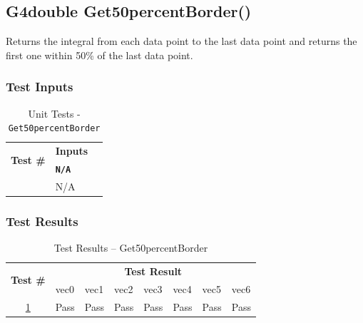 \documentclass[12pt]{article}
\newcounter{TestCounter}
\begin{document}
\subsection{G4double Get50percentBorder()}%
	
	 Returns the integral from each data point to the last data point and returns the first one within 
50\% of the last data point.
	
	\subsubsection{Test Inputs}
		\begin{table}[H]
		\centering
		\caption{Unit Tests - \texttt{Get50percentBorder}}\label{Get50percentBorder_unit}
		\begin{tabular}{lll}
		\toprule
		\multirow{2}{*}{\bf Test \#}  & \multicolumn{1}{c}{\bf Inputs}\\
		& \bf \texttt{N/A}\\\midrule
		{TestCounter}\arabic{TestCounter}\label{Get50percentBorder_0} & N/A \\
		\bottomrule
		\end{tabular}
		\end{table}
	
	\subsubsection{Test Results}
		\begin{table}[H]
		\centering
		\caption{Test Results -- Get50percentBorder}\label{Get50percentBorder_acc}
		\begin{tabular}{clllllll}
		\toprule
		\multirow{2}{*}{\bf Test \#} & \multicolumn{7}{c}{\bf Test Result}\\
		& vec0 & vec1 & vec2 & vec3 & vec4 & vec5 & vec6\\\midrule
		\ref{Get50percentBorder_0} & Pass & Pass & Pass & Pass & Pass & Pass & Pass\\
		\bottomrule
		\end{tabular}
		\end{table}
\end{document}
